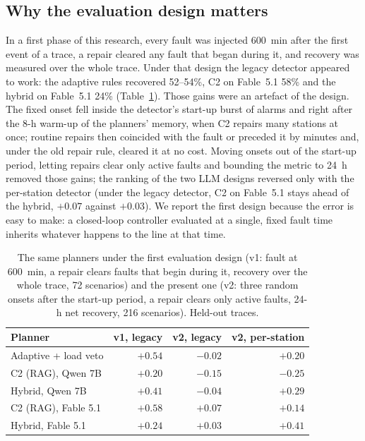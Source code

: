 \documentclass[preprint,11pt]{elsarticle}
\begin{document}
\subsection{Why the evaluation design matters}
\label{sec:designs}
In a first phase of this research, every fault was injected 600~min after the first event of a trace, a repair cleared any fault that began during it, and recovery was measured over the whole trace. Under that design the legacy detector appeared to work: the adaptive rules recovered 52--54\%, C2 on Fable~5.1 58\% and the hybrid on Fable~5.1 24\% (Table~\ref{tab:designs}). Those gains were an artefact of the design. The fixed onset fell inside the detector's start-up burst of alarms and right after the 8-h warm-up of the planners' memory, when C2 repairs many stations at once; routine repairs then coincided with the fault or preceded it by minutes and, under the old repair rule, cleared it at no cost. Moving onsets out of the start-up period, letting repairs clear only active faults and bounding the metric to 24~h removed those gains; the ranking of the two LLM designs reversed only with the per-station detector (under the legacy detector, C2 on Fable~5.1 stays ahead of the hybrid, $+0.07$ against $+0.03$). We report the first design because the error is easy to make: a closed-loop controller evaluated at a single, fixed fault time inherits whatever happens to the line at that time.

\begin{table}[t]
\centering
\caption{The same planners under the first evaluation design (v1: fault at 600~min, a repair clears faults that begin during it, recovery over the whole trace, 72 scenarios) and the present one (v2: three random onsets after the start-up period, a repair clears only active faults, 24-h net recovery, 216 scenarios). Held-out traces.}
\label{tab:designs}
\small
\begin{tabular}{lrrr}
\toprule
Planner & v1, legacy & v2, legacy & v2, per-station \\
\midrule
Adaptive + load veto & $+0.54$ & $-0.02$ & $+0.20$ \\
C2 (RAG), Qwen 7B & $+0.20$ & $-0.15$ & $-0.25$ \\
Hybrid, Qwen 7B & $+0.41$ & $-0.04$ & $+0.29$ \\
C2 (RAG), Fable 5.1 & $+0.58$ & $+0.07$ & $+0.14$ \\
Hybrid, Fable 5.1 & $+0.24$ & $+0.03$ & $+0.41$ \\
\bottomrule
\end{tabular}
\end{table}
\end{document}
